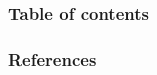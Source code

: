 \documentclass{beamer}
\title{}
\author{}
\institute{\\ \vspace{1em}
  Institute of Computer Science\\
  Freie Universität Berlin}
\date{\today}
\begin{document}

\begin{frame}
  \titlepage
\end{frame}


\begin{frame}
  \frametitle{Table of contents}

  \setcounter{tocdepth}{2}
  \tableofcontents
\end{frame}


\begin{frame}[allowframebreaks]
  \frametitle{References}

  
\end{frame}

\end{document}
